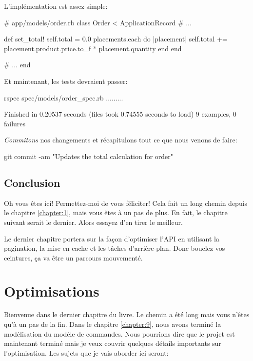 \documentclass[]{report}
\begin{document}
    L'implémentation est assez simple:

    \begin{listing}
      \begin{rubycode}
      # app/models/order.rb
      class Order < ApplicationRecord
        # ...

        def set_total!
          self.total = 0.0
          placements.each do |placement|
            self.total += placement.product.price.to_f * placement.quantity
          end
        end

        # ...
      end
      \end{rubycode}
    \end{listing}

    Et maintenant, les tests devraient passer:

    \begin{bashcode}
    rspec spec/models/order_spec.rb
    .........

    Finished in 0.20537 seconds (files took 0.74555 seconds to load)
    9 examples, 0 failures
    \end{bashcode}

    \textit{Commitons} nos changements et récapitulons tout ce que nous venons de faire:

    \begin{bashcode}
    git commit -am "Updates the total calculation for order"
    \end{bashcode}

  \section{Conclusion}

    Oh vous êtes ici! Permettez-moi de vous féliciter! Cela fait un long chemin depuis le chapitre \ref{chapter:1}, mais vous êtes à un pas de plus. En fait, le chapitre suivant serait le dernier. Alors essayez d'en tirer le meilleur.

    Le dernier chapitre portera sur la façon d'optimiser l'API en utilisant la pagination, la mise en cache et les tâches d'arrière-plan. Donc bouclez vos ceintures, ça va être un parcours mouvementé.

\chapter{Optimisations}\label{chapter:10}

  Bienvenue dans le dernier chapitre du livre. Le chemin a été long mais vous n'êtes qu'à un pas de la fin. Dans le chapitre \ref{chapter:9}, nous avons terminé la modélisation du modèle de commandes. Nous pourrions dire que le projet est maintenant terminé mais je veux couvrir quelques détails importants sur l'optimisation. Les sujets que je vais aborder ici seront:
\end{document}
